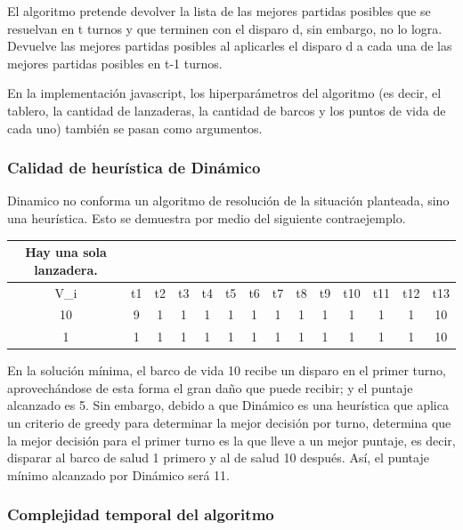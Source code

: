 \documentclass{article}
\begin{document}
El algoritmo pretende devolver la lista de las mejores partidas posibles que se resuelvan en t turnos y que terminen con el disparo d, sin embargo, no lo logra. Devuelve las mejores partidas posibles al aplicarles el disparo d a cada una de las mejores partidas posibles en t-1 turnos.

En la implementación javascript, los hiperparámetros del algoritmo (es decir, el tablero, la cantidad de lanzaderas, la cantidad de barcos y los puntos de vida de cada uno) también se pasan como argumentos.

\subsubsection{Calidad de heurística de Dinámico}

Dinamico no conforma un algoritmo de resolución de la situación planteada, sino una heurística. Esto se demuestra por medio del siguiente contraejemplo.

\begin{center}
\begin{tabular}{ c | c c c c c c c c c c c c c}
Hay una sola lanzadera. \\
\hline
V\_i & t1 & t2 & t3 & t4 & t5 & t6 & t7 & t8 & t9 & t10 & t11 & t12 & t13 \\
\hline
10    &  9 &  1 &  1 &  1 &  1 &  1 & 1 &  1 &  1 &  1 &  1 & 1  & 10 \\
1     &  1 &  1 &  1 &  1 &  1 &  1 & 1 &  1 &  1 &  1 &  1 & 1  & 10
\end{tabular}
\end{center}

En la solución mínima, el barco de vida 10 recibe un disparo en el primer turno, aprovechándose de esta forma el gran daño que puede recibir; y el puntaje alcanzado es 5. Sin embargo, debido a que Dinámico es una heurística que aplica un criterio de greedy para determinar la mejor decisión por turno, determina que la mejor decisión para el primer turno es la que lleve a un mejor puntaje, es decir, disparar al barco de salud 1 primero y al de salud 10 después. Así, el puntaje mínimo alcanzado por Dinámico será 11.

\subsubsection{Complejidad temporal del algoritmo}
\end{document}
